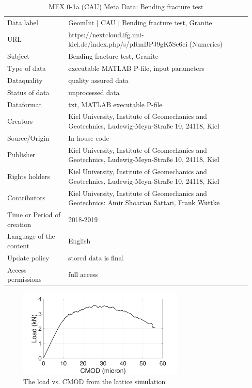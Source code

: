 \begin{table}[!ht]
\caption{MEX 0-1a (CAU) Meta Data: Bending fracture test}
\label{tab:dms-mex0-1a-cau}
\small
\begin{tabular}{R{2.75cm}|L{8.5cm}}
\hline
%
Data label & GeomInt | CAU | Bending fracture test, Granite \\
URL &  https://nextcloud.ifg.uni-kiel.de/index.php/s/pRmBPJ9gK5Se6ci (Numerics)\\
Subject  &  Bending fracture test, Granite\\
Type of data  &  executable MATLAB P-file, input parameters\\
Dataquality  &  quality assured data \\
Status of data  &  unprocessed data\\
Dataformat  & txt, MATLAB executable P-file\\
Creators  &  Kiel University, Institute of Geomechanics and Geotechnics, Ludewig-Meyn-Stra\ss e 10, 24118, Kiel\\
Source/Origin & In-house code \\
Publisher  &  Kiel University, Institute of Geomechanics and Geotechnics, Ludewig-Meyn-Stra\ss e 10, 24118, Kiel \\
Rights holders &  Kiel University, Institute of Geomechanics and Geotechnics, Ludewig-Meyn-Stra\ss e 10, 24118, Kiel \\
Contributors &   Kiel University, Institute of Geomechanics and Geotechnics: Amir Shoarian Sattari, Frank Wuttke\\
Time or Period of creation &  2018-2019\\
Language of the content &  English\\
Update policy &  stored data is final\\
Access permissions & full access\\
%
\hline
\end{tabular}
\end{table}

\begin{figure}[!ht]
\centering
\includegraphics[width=0.75\textwidth]{figures/Amir_ME1_LEM_Displacement_Crystalline_Data.png}
\caption{The load vs. CMOD from the lattice simulation}
\label{fig:Amir_ME1_LEM_Displacement_Crystalline_Data}
\end{figure}

